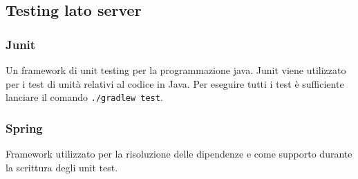 \subsection{Testing lato server}
\subsubsection{Junit}
Un framework di unit testing per la programmazione java. Junit viene utilizzato per i test di unità relativi al codice in Java.
Per eseguire tutti i test è sufficiente lanciare il comando \texttt{./gradlew test}.

\subsubsection{Spring}
Framework utilizzato per la risoluzione delle dipendenze e come supporto durante la scrittura degli unit test.